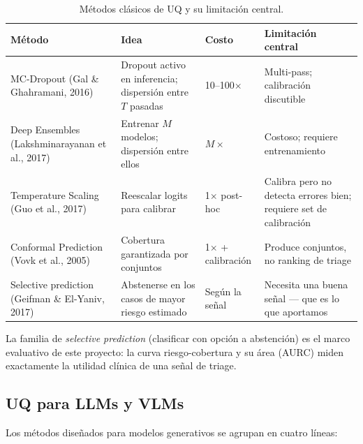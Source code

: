 \documentclass[12pt,a4paper]{article}
\begin{document}
\begin{table}[H]
\centering
\small
\caption{Métodos clásicos de UQ y su limitación central.}
\label{tab:uq-clasicos}
\begin{tabularx}{\textwidth}{lXXX}
\toprule
\textbf{Método} & \textbf{Idea} & \textbf{Costo} & \textbf{Limitación central} \\
\midrule
MC-Dropout (Gal \& Ghahramani, 2016) & Dropout activo en inferencia; dispersión entre $T$ pasadas & 10--100$\times$ & Multi-pass; calibración discutible \\
Deep Ensembles (Lakshminarayanan et al., 2017) & Entrenar $M$ modelos; dispersión entre ellos & $M\times$ & Costoso; requiere entrenamiento \\
Temperature Scaling (Guo et al., 2017) & Reescalar logits para calibrar & 1$\times$ post-hoc & Calibra pero no detecta errores bien; requiere set de calibración \\
Conformal Prediction (Vovk et al., 2005) & Cobertura garantizada por conjuntos & 1$\times$ + calibración & Produce conjuntos, no ranking de triage \\
Selective prediction (Geifman \& El-Yaniv, 2017) & Abstenerse en los casos de mayor riesgo estimado & Según la señal & Necesita una buena señal --- que es lo que aportamos \\
\bottomrule
\end{tabularx}
\end{table}

La familia de \emph{selective prediction} (clasificar con opción a
abstención) es el marco evaluativo de este proyecto: la curva
riesgo-cobertura y su área (AURC) miden exactamente la utilidad clínica de
una señal de triage.

\subsection{UQ para LLMs y VLMs}

Los métodos diseñados para modelos generativos se agrupan en cuatro
líneas:
\end{document}

